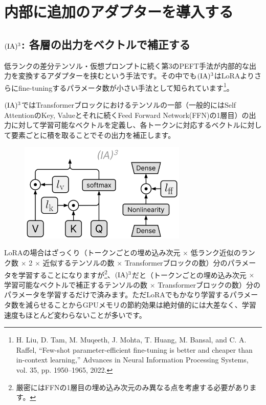 \documentclass[a5paper,twoside,dvipdfmx]{jsarticle}
\begin{document}
\newpage

\section{内部に追加のアダプターを導入する}

\subsection{$\rm{(IA)^3}$: 各層の出力をベクトルで補正する}

低ランクの差分テンソル・仮想プロンプトに続く第3のPEFT手法が内部的な出力を変換するアダプターを挟むという手法です。その中でも$\rm{(IA)^3}$はLoRAよりさらにfine-tuningするパラメータ数が小さい手法として知られています\footnote{H. Liu, D. Tam, M. Muqeeth, J. Mohta, T. Huang, M. Bansal, and C. A. Raffel, “Few-shot parameter-efficient fine-tuning is better and cheaper than in-context learning,” Advances in Neural Information Processing Systems, vol. 35, pp. 1950–1965, 2022.}。

$\rm{(IA)^3}$ではTransformerブロックにおけるテンソルの一部（一般的にはSelf AttentionのKey, Valueとそれに続くFeed Forward Network(FFN)の1層目）の出力に対して学習可能なベクトルを定義し、各トークンに対応するベクトルに対して要素ごとに積を取ることでその出力を補正します。


\begin{figure}[h]
  \centering
  \includegraphics[width=80mm]{../C105Fig/gray/ia3_image.png}
 \end{figure} 

LoRAの場合はざっくり（トークンごとの埋め込み次元 $\times$ 低ランク近似のランク数 $\times$ 2 $\times$ 近似するテンソルの数 $\times$ Transformerブロックの数）分のパラメータを学習することになりますが\footnote{厳密にはFFNの1層目の埋め込み次元のみ異なる点を考慮する必要があります。}、$\rm{(IA)^3}$だと（トークンごとの埋め込み次元 $\times$ 学習可能なベクトルで補正するテンソルの数 $\times$ Transformerブロックの数）分のパラメータを学習するだけで済みます。ただLoRAでもかなり学習するパラメータ数を減らせることからGPUメモリの節約効果は絶対値的には大差なく、学習速度もほとんど変わらないことが多いです。
\end{document}
